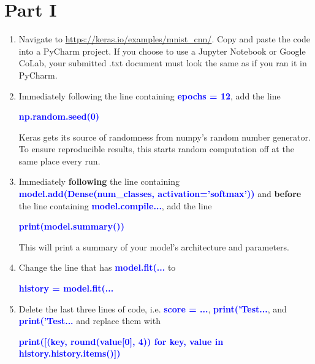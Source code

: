 \documentclass[12pt]{article}
\theoremstyle{plain}
\theoremstyle{definition}
\begin{document}
\section*{Part I}
\begin{enumerate}
\item Navigate to \url{https://keras.io/examples/mnist_cnn/}. Copy and paste the code into a PyCharm project. If you choose to use a Jupyter Notebook or Google CoLab, your submitted .txt document must look the same as if you ran it in PyCharm.

\item Immediately following the line containing \textbf{\textcolor{blue}{epochs = 12}}, add the line 
\vspace{-4mm}
\begin{center}
\textbf{\textcolor{blue}{np.random.seed(0)}}
\end{center}
\vspace{-4mm}
Keras gets its source of randomness from numpy's random number generator. To ensure reproducible results, this starts random computation off
at the same place every run.

\item Immediately \textbf{following} the line containing \\ \textbf{\textcolor{blue}{model.add(Dense(num\_classes, activation='softmax'))}} and \textbf{before} the line containing \textbf{\textcolor{blue}{model.compile...}}, add the line
\vspace{-4mm}
\begin{center}
 \textbf{\textcolor{blue}{print(model.summary())}}
 \end{center} 
\vspace{-4mm} 
This will print a summary of your model's architecture and parameters.

\item Change the line that has \textbf{\textcolor{blue}{model.fit(...}} to 
\vspace{-4mm}
\begin{center}
\textbf{\textcolor{blue}{history = model.fit(...}}
 \end{center} 
\vspace{-4mm}

\item Delete the last three lines of code, i.e.  \textbf{\textcolor{blue}{score = ...}},  \textbf{\textcolor{blue}{print('Test...}}, and  \textbf{\textcolor{blue}{print('Test...}} and replace them with 
\vspace{-4mm}
\begin{center}
\textbf{\textcolor{blue}{print([(key, round(value[0], 4)) for key, value in history.history.items()])}}
\end{center}
\vspace{-4mm}


\end{enumerate}
\end{document}
